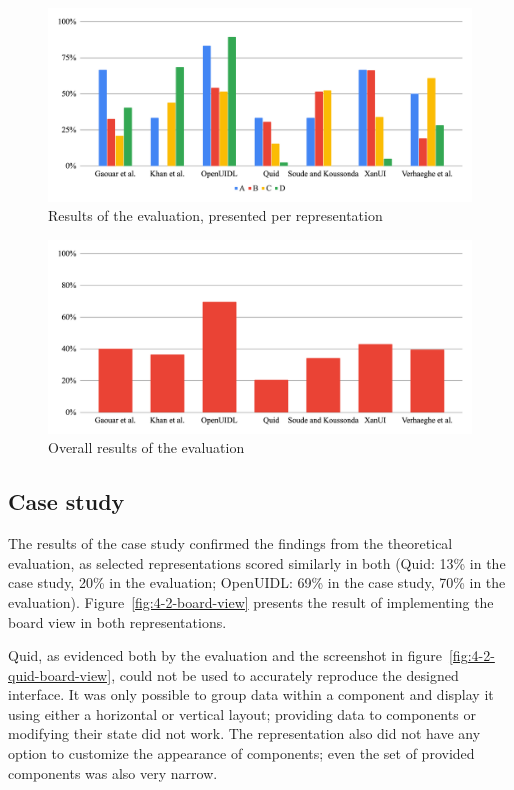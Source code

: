 \begin{figure}
    \centering
    \includegraphics[width=\textwidth]{4-results-and-discussion/results-per-representation}
    \caption{Results of the evaluation, presented per representation}
    \label{fig:4-2-results-per-representation}
\end{figure}

\begin{figure}
    \centering
    \includegraphics[width=\textwidth]{4-results-and-discussion/results-total}
    \caption{Overall results of the evaluation}
    \label{fig:4-2-results-total}
\end{figure}

\subsection{Case study}\label{subsec:case-study}
The results of the case study confirmed the findings from the theoretical evaluation, as selected representations scored similarly in both (Quid: 13\% in the case study, 20\% in the evaluation; OpenUIDL: 69\% in the case study, 70\% in the evaluation).
Figure~\ref{fig:4-2-board-view} presents the result of implementing the board view in both representations.

Quid, as evidenced both by the evaluation and the screenshot in figure~\ref{fig:4-2-quid-board-view}, could not be used to accurately reproduce the designed interface.
It was only possible to group data within a component and display it using either a horizontal or vertical layout; providing data to components or modifying their state did not work.
The representation also did not have any option to customize the appearance of components; even the set of provided components was also very narrow.

